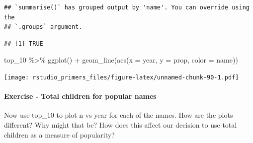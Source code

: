 \documentclass[
]{article}
\newenvironment{Shaded}{\begin{snugshade}}{\end{snugshade}}
\newcommand{\AttributeTok}[1]{\textcolor[rgb]{0.77,0.63,0.00}{#1}}
\newcommand{\CommentTok}[1]{\textcolor[rgb]{0.56,0.35,0.01}{\textit{#1}}}
\newcommand{\FunctionTok}[1]{\textcolor[rgb]{0.00,0.00,0.00}{#1}}
\newcommand{\NormalTok}[1]{#1}
\newcommand{\OtherTok}[1]{\textcolor[rgb]{0.56,0.35,0.01}{#1}}
\newcommand{\SpecialCharTok}[1]{\textcolor[rgb]{0.00,0.00,0.00}{#1}}
\newcommand{\StringTok}[1]{\textcolor[rgb]{0.31,0.60,0.02}{#1}}
\begin{document}
\begin{verbatim}
## `summarise()` has grouped output by 'name'. You can override using the
## `.groups` argument.
\end{verbatim}

\begin{Shaded}
\end{Shaded}

\begin{verbatim}
## [1] TRUE
\end{verbatim}

\begin{Shaded}
\begin{Highlighting}[]
\NormalTok{top\_10 }\SpecialCharTok{\%\textgreater{}\%}
  \FunctionTok{ggplot}\NormalTok{() }\SpecialCharTok{+}
    \FunctionTok{geom\_line}\NormalTok{(}\FunctionTok{aes}\NormalTok{(}\AttributeTok{x =}\NormalTok{ year, }\AttributeTok{y =}\NormalTok{ prop, }\AttributeTok{color =}\NormalTok{ name))}
\end{Highlighting}
\end{Shaded}

\texttt{[image: rstudio\_primers\_files/figure-latex/unnamed-chunk-90-1.pdf]}

\hypertarget{exercise---total-children-for-popular-names}{%
\paragraph{Exercise - Total children for popular
names}\label{exercise---total-children-for-popular-names}}

Now use top\_10 to plot n vs year for each of the names. How are the
plots different? Why might that be? How does this affect our decision to
use total children as a measure of popularity?
\end{document}

